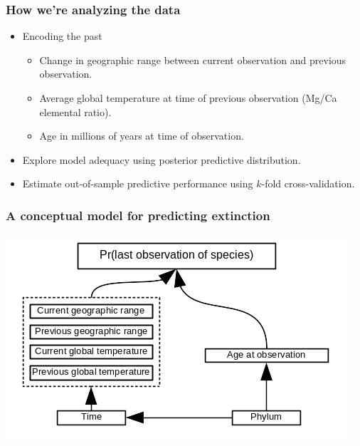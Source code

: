 \documentclass{beamer}
\begin{document}
\begin{frame}
  \frametitle{How we're analyzing the data}

  \begin{itemize}%
    \item Encoding the past
      \begin{itemize}
        \item Change in geographic range between current observation and previous observation.
        \item Average global temperature at time of previous observation (Mg/Ca elemental ratio).
        \item Age in millions of years at time of observation.
      \end{itemize}
    \item Explore model adequacy using posterior predictive distribution.
    \item Estimate out-of-sample predictive performance using \(k\)-fold cross-validation.
  \end{itemize}

\end{frame}


\begin{frame}
  \frametitle{A conceptual model for predicting extinction}

  \begin{center}
    \includegraphics[width=\textwidth,height=\textheight,keepaspectratio=true]{figure/conceptual_diagram}
  \end{center}

\end{frame}
\end{document}
